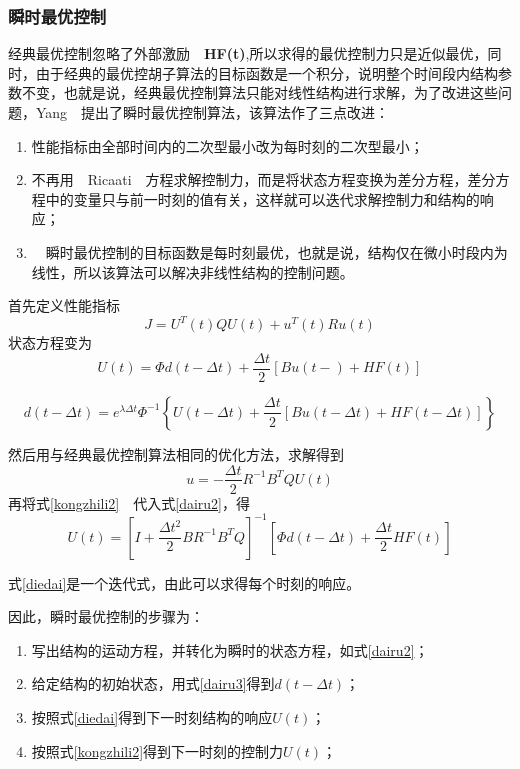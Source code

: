 \subsubsection{瞬时最优控制}
经典最优控制忽略了外部激励　\textbf{HF(t)},所以求得的最优控制力只是近似最优，同时，由于经典的最优控胡子算法的目标函数是一个积分，说明整个时间段内结构参数不变，也就是说，经典最优控制算法只能对线性结构进行求解，为了改进这些问题，Yang　提出了瞬时最优控制算法，该算法作了三点改进：
\begin{enumerate}
\item 性能指标由全部时间内的二次型最小改为每时刻的二次型最小；
\item 不再用　Ricaati　方程求解控制力，而是将状态方程变换为差分方程，差分方程中的变量只与前一时刻的值有关，这样就可以迭代求解控制力和结构的响应；
\item　瞬时最优控制的目标函数是每时刻最优，也就是说，结构仅在微小时段内为线性，所以该算法可以解决非线性结构的控制问题。
\end{enumerate}

首先定义性能指标
\begin{equation}
J=U^T(t)QU(t)+u^T(t)Ru(t)
\end{equation}
状态方程变为
\begin{equation}
U(t)=\Phi d(t-\Delta t)+\frac{\Delta t}{2}\left[Bu(t-)+HF(t)\right]\label{dairu2}
\end{equation}


\begin{equation}
d(t-\Delta t)=e^{\lambda \Delta t}\Phi^{-1}\left\lbrace U(t-\Delta t)+ \frac{\Delta t}{2}\left[Bu(t-\Delta t)+HF(t-\Delta t)\right]\right\rbrace\label{dairu3}
\end{equation}

然后用与经典最优控制算法相同的优化方法，求解得到
\begin{equation}
u=-\frac{\Delta t}{2}R^{-1}B^TQU(t)    \label{kongzhili2}
\end{equation}
再将式\eqref{kongzhili2}　代入式\eqref{dairu2}，得
\begin{equation}
U(t)=\left[I+\frac{\Delta t^2}{2}BR^{-1}B^TQ\right]^{-1}\left[\Phi d(t-\Delta t) +\frac{\Delta t}{2}HF(t)\right]  \label{diedai}
\end{equation}

式\eqref{diedai}是一个迭代式，由此可以求得每个时刻的响应。

因此，瞬时最优控制的步骤为：
\begin{enumerate}
\item 写出结构的运动方程，并转化为瞬时的状态方程，如式\eqref{dairu2}；
\item 给定结构的初始状态，用式\eqref{dairu3}得到$d(t-\Delta t)$；
\item 按照式\eqref{diedai}得到下一时刻结构的响应$U(t)$；
\item 按照式\eqref{kongzhili2}得到下一时刻的控制力$U(t)$；
\end{enumerate}

